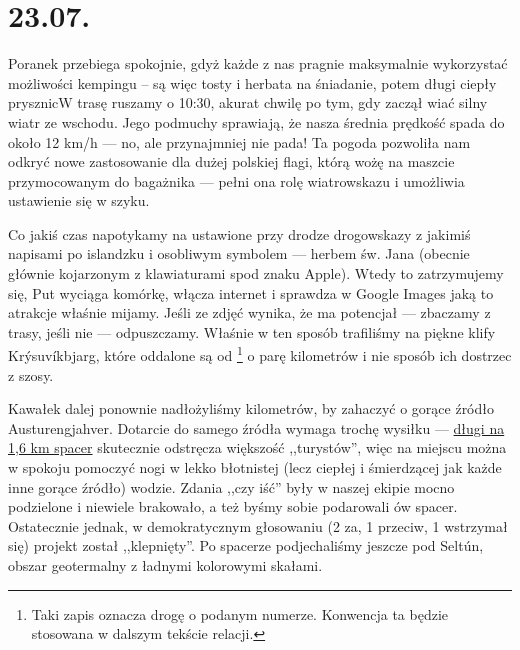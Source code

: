 \chapter*{23.07.}

Poranek przebiega spokojnie, gdyż każde z nas pragnie maksymalnie wykorzystać możliwości kempingu -- są więc tosty i herbata na śniadanie, potem długi ciepły prysznic\textellipsis W trasę ruszamy o 10:30, akurat chwilę po tym, gdy zaczął wiać silny wiatr ze wschodu. Jego podmuchy sprawiają, że nasza średnia prędkość spada do około 12 km/h --- no, ale przynajmniej nie pada! Ta pogoda pozwoliła nam odkryć nowe zastosowanie dla dużej polskiej flagi, którą wożę na maszcie przymocowanym do bagażnika --- pełni ona rolę wiatrowskazu i umożliwia ustawienie się w szyku.


Co jakiś czas napotykamy na ustawione przy drodze drogowskazy z jakimiś napisami po islandzku i osobliwym symbolem --- herbem św. Jana (obecnie głównie kojarzonym z klawiaturami spod znaku Apple). Wtedy to zatrzymujemy się, Put wyciąga komórkę, włącza internet i sprawdza w Google Images jaką to atrakcje właśnie mijamy. Jeśli ze zdjęć wynika, że ma potencjał --- zbaczamy z trasy, jeśli nie --- odpuszczamy. Właśnie w ten sposób trafiliśmy na piękne klify Krýsuvíkbjarg, które oddalone są od \footnote{Taki zapis oznacza drogę o podanym numerze. Konwencja ta będzie stosowana w dalszym tekście relacji.} o parę kilometrów i nie sposób ich dostrzec z szosy.


Kawałek dalej ponownie nadłożyliśmy kilometrów, by zahaczyć o gorące źródło Austurengjahver. Dotarcie do samego źródła wymaga trochę wysiłku --- \href{http://www.openstreetmap.org/way/33182596}{długi na 1,6 km spacer} skutecznie odstręcza większość ,,turystów'', więc na miejscu można w spokoju pomoczyć nogi w lekko błotnistej (lecz ciepłej i śmierdzącej jak każde inne gorące źródło) wodzie. Zdania ,,czy iść'' były w naszej ekipie mocno podzielone i niewiele brakowało, a też byśmy sobie podarowali ów spacer. Ostatecznie jednak, w demokratycznym głosowaniu (2 za, 1 przeciw, 1 wstrzymał się) projekt został ,,klepnięty''. Po spacerze podjechaliśmy jeszcze pod Seltún, obszar geotermalny z ładnymi kolorowymi skałami.

